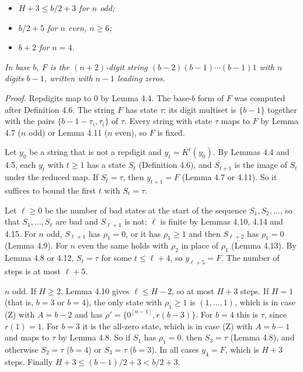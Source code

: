 \documentclass[11pt,letterpaper]{article}
\providecommand{\tightlist}{%
  \setlength{\itemsep}{0pt}\setlength{\parskip}{0pt}}
\theoremstyle{paperstyle}
\theoremstyle{paperstyledef}
\theoremstyle{paperstylerem}
\begin{document}
\begin{itemize}
\tightlist
\item
  \emph{\(H + 3 \leq b/2 + 3\) for \(n\) odd;}
\item
  \emph{\(b/2 + 5\) for \(n\) even, \(n \geq 6\);}
\item
  \emph{\(b + 2\) for \(n = 4\).}
\end{itemize}

\emph{In base \(b\), \(F\) is the \((n+2)\)-digit string \((b-2)(b-1)\cdots(b-1)1\) with \(n\) digits \(b-1\), written with \(n-1\) leading zeros.}

\emph{Proof.} Repdigits map to \(0\) by Lemma 4.4. The base-\(b\) form of \(F\) was computed after Definition 4.6. The string \(F\) has state \(\tau\): its digit multiset is \(\{b-1\}\) together with the pairs \(\{b-1-\tau_i, \tau_i\}\) of \(\tau\). Every string with state \(\tau\) maps to \(F\) by Lemma 4.7 (\(n\) odd) or Lemma 4.11 (\(n\) even), so \(F\) is fixed.

Let \(y_0\) be a string that is not a repdigit and \(y_t = K^t(y_0)\). By Lemmas 4.4 and 4.5, each \(y_t\) with \(t \geq 1\) has a state \(S_t\) (Definition 4.6), and \(S_{t+1}\) is the image of \(S_t\) under the reduced map. If \(S_t = \tau\), then \(y_{t+1} = F\) (Lemma 4.7 or 4.11). So it suffices to bound the first \(t\) with \(S_t = \tau\).

Let \(\ell \geq 0\) be the number of bad states at the start of the sequence \(S_1, S_2, \dots\), so that \(S_1, \dots, S_\ell\) are bad and \(S_{\ell+1}\) is not; \(\ell\) is finite by Lemmas 4.10, 4.14 and 4.15. For \(n\) odd, \(S_{\ell+1}\) has \(\rho_1 = 0\), or it has \(\rho_1 \geq 1\) and then \(S_{\ell+2}\) has \(\rho_1 = 0\) (Lemma 4.9). For \(n\) even the same holds with \(\rho_2\) in place of \(\rho_1\) (Lemma 4.13). By Lemma 4.8 or 4.12, \(S_t = \tau\) for some \(t \leq \ell + 4\), so \(y_{\ell+5} = F\). The number of steps is at most \(\ell + 5\).

\(n\) odd. If \(H \geq 2\), Lemma 4.10 gives \(\ell \leq H - 2\), so at most \(H + 3\) steps. If \(H = 1\) (that is, \(b = 3\) or \(b = 4\)), the only state with \(\rho_1 \geq 1\) is \((1, \dots, 1)\), which is in case (Z) with \(A = b-2\) and has \(\rho' = \{0^{[n-1]}, r(b-3)\}\). For \(b = 4\) this is \(\tau\), since \(r(1) = 1\). For \(b = 3\) it is the all-zero state, which is in case (Z) with \(A = b-1\) and maps to \(\tau\) by Lemma 4.8. So if \(S_1\) has \(\rho_1 = 0\), then \(S_3 = \tau\) (Lemma 4.8), and otherwise \(S_2 = \tau\) (\(b = 4\)) or \(S_3 = \tau\) (\(b = 3\)). In all cases \(y_4 = F\), which is \(H + 3\) steps. Finally \(H + 3 \leq (b-1)/2 + 3 < b/2 + 3\).
\end{document}
